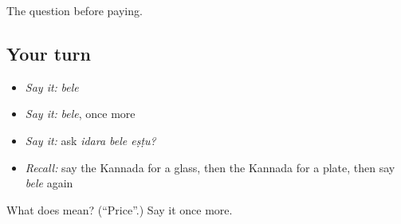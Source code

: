 \begin{grammarlens}[title={What you've built}]
The question before paying.
\end{grammarlens}

\subsection*{Your turn}
\begin{itemize}
\raggedright
  \item \emph{Say it:} \emph{bele}
  \item \emph{Say it:} \emph{bele}, once more
  \item \emph{Say it:} ask \emph{idara bele eṣṭu?}
  \item \emph{Recall:} say the Kannada for a glass, then the Kannada for a plate, then say \emph{bele} again
\end{itemize}

\begin{tcolorbox}[breakable,colback=teal!4,colframe=teal!35!black,title={Before you move on}]
What does  mean? (\textquotedblleft{}Price\textquotedblright{}.) Say it once more.
\end{tcolorbox}
